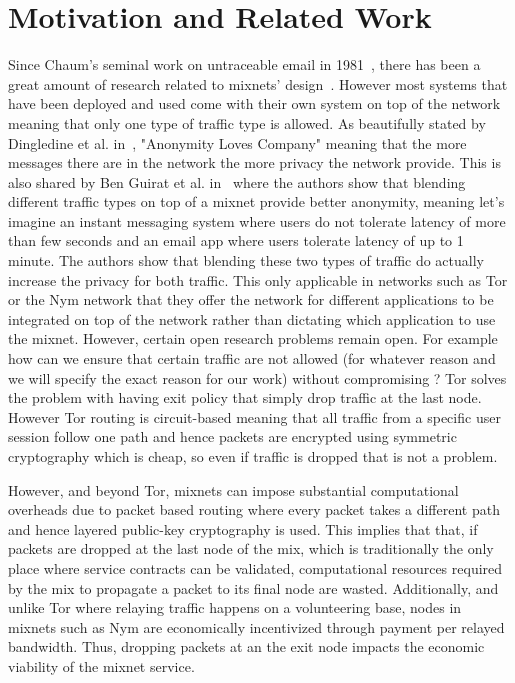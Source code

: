 \section{Motivation and Related Work}
\label{sec:related}

Since Chaum’s seminal work on untraceable email in 1981~\cite{chaum-mix}, there has been a great amount of research related to mixnets' design~\cite{piotrowska2017loopix, van2015vuvuzela, kwon2020xrd, lazar2018karaoke, cottrell1995mixmaster, alexopoulos2017MCMIX, chaum2016cmix, chaum-mix, danezis2003mixminion}. However most systems that have been deployed and used come with their own system on top of the network meaning that only one type of traffic type is allowed. As beautifully stated by Dingledine et al. in~\cite{dingledine2006anonymity}, "Anonymity Loves Company" meaning that the more messages there are in the network the more privacy the network provide. This is also shared by Ben Guirat et al. in~\cite{benguirat2023blending} where the authors show that blending different traffic types on top of a mixnet provide better anonymity, meaning let's imagine an instant messaging system where users do not tolerate latency of more than few seconds and an email app where users tolerate latency of up to 1 minute. The authors show that blending these two types of traffic do actually increase the privacy for both traffic. This only applicable in networks such as Tor or the Nym network that they offer the network for different applications to be integrated on top of the network rather than dictating which application to use the mixnet.
However, certain open research problems remain open. For example how can we ensure that certain traffic are not allowed (for whatever reason and we will specify the exact reason for our work) without compromising ?
Tor solves the problem with having exit policy that simply drop traffic at the last node. However Tor routing is circuit-based meaning that all traffic from a specific user session follow one path and hence packets are encrypted using symmetric cryptography which is cheap, so even if traffic is dropped that is not a problem.

However, and beyond Tor, mixnets can impose substantial computational
overheads due to packet based routing where every packet takes a different
path and hence layered public-key cryptography is used. This implies that
that, if packets are dropped at the last node of the mix, which is
traditionally the only place where service contracts can be validated,
computational resources required by the mix to propagate a packet to its
final node are wasted. Additionally, and unlike Tor where relaying traffic
happens on a volunteering base, nodes in mixnets such as Nym are
economically incentivized through payment per relayed bandwidth. Thus,
dropping packets at an the exit node impacts the economic viability of the
mixnet service.

